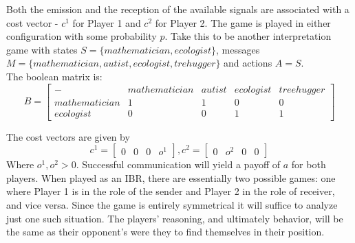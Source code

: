 \documentclass[10]{article}
\begin{document}
Both the emission and the reception of the available signals are associated with a cost vector - $c^1$ for Player 1 and $c^2$ for Player 2. The game is played in either configuration with some probability $p$. Take this to be another interpretation game with states $S=\{mathematician, ecologist\}$, messages $M=\{mathematician,autist,ecologist,trehugger\}$ and actions $A=S$.\\
The boolean matrix is:
\begin{equation*}
B=
\begin{bmatrix}
- & mathematician & autist & ecologist & treehugger \\
mathematician  & 1      & 1    & 0        & 0   \\
ecologist  & 0     & 0   & 1       & 1 
\end{bmatrix}
\end{equation*}

The cost vectors are given by 
\begin{equation*}
c^1=
\begin{bmatrix}
0 & 0 & 0 & o^1
\end{bmatrix}
,
c^2=
\begin{bmatrix}
0 & o^2 & 0 & 0
\end{bmatrix}
\end{equation*}
Where $o^1,o^2>0$. Successful communication will yield a payoff of $a$ for both players. When played as an IBR, there are essentially two possible games: one where Player 1 is in the role of the sender and Player 2 in the role of receiver, and vice versa. Since the game is entirely symmetrical it will suffice to analyze just one such situation. The players' reasoning, and ultimately behavior, will be the same as their opponent's were they to find themselves in their position.
\end{document}
